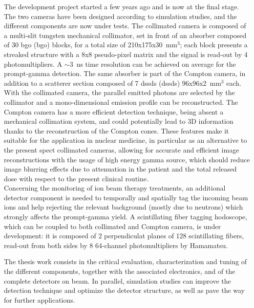 The development project started a few years ago and is now at the final stage. The two cameras have been designed according to simulation studies, and the different components are now under tests.
The collimated camera is composed of a multi-slit tungsten mechanical collimator, set in front of an absorber composed of 30 \glsdesc{bgo} (\gls{bgo}) blocks, for a total size of 210x175x30~mm$^{3}$; each block presents a streaked structure with a 8x8 pseudo-pixel matrix and the signal is read-out by 4 photomultipliers. A $\sim$3~ns time resolution can be achieved on average for the prompt-gamma detection. The same absorber is part of the Compton camera, in addition to a scatterer section composed of 7 \glsdesc{dssd}s (\glspl{dssd}) 96x96x2~mm$^{3}$ each.
With the collimated camera, the parallel emitted photons are selected by the collimator and a mono-dimensional emission profile can be reconstructed. The Compton camera has a more efficient detection technique, being absent a mechanical collimation system, and could potentially lead to 3D information thanks to the reconstruction of the Compton cones. These features make it suitable for the application in nuclear medicine, in particular as an alternative to the present \gls{spect} collimated cameras, allowing for accurate and efficient image reconstructions with the usage of high energy gamma source, which should reduce image blurring effects due to attenuation in the patient and the total released dose with respect to the present clinical routine.\\ 
Concerning the monitoring of ion beam therapy treatments, an additional detector component is needed to temporally and spatially tag the incoming beam ions and help rejecting the relevant background (mostly due to neutrons) which strongly affects the prompt-gamma yield. A scintillating fiber tagging hodoscope, which can be coupled to both collimated and Compton camera, is under development: it is composed of 2 perpendiculat planes of 128 scintillating fibers, read-out from both sides by 8 64-channel photomultipliers by Hamamatsu.
 
The thesis work consists in the critical evaluation, characterization and tuning of the different components, together with the associated electronics, and of the complete detectors on beam. In parallel, simulation studies can improve the detection technique and optimize the detector structure, as well as pave the way for further applications.

